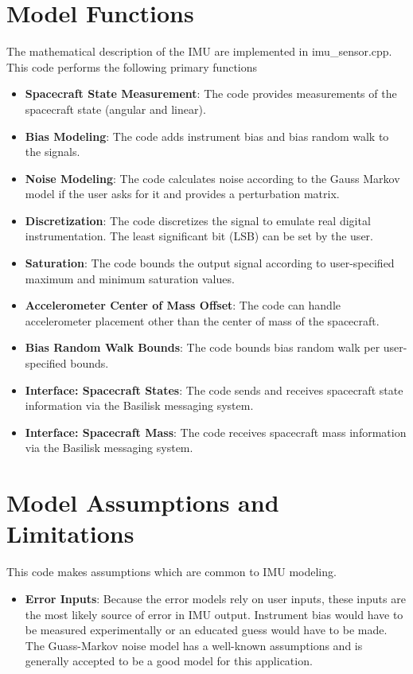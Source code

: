 \section{Model Functions}
The mathematical description of the IMU are implemented in imu\_sensor.cpp. This code performs the following primary functions
\begin{itemize}
	\item \textbf{Spacecraft State Measurement}: The code provides measurements of the spacecraft state (angular and linear).
	\item \textbf{Bias Modeling}: The code adds instrument bias and bias random walk to the signals.
	\item \textbf{Noise Modeling}: The code calculates noise according to the Gauss Markov model if the user asks for it and provides a perturbation matrix.
	\item \textbf{Discretization}: The code discretizes the signal to emulate real digital instrumentation. The least significant bit (LSB) can be set by the user.
	\item \textbf{Saturation}: The code bounds the output signal according to user-specified maximum and minimum saturation values.
	\item \textbf{Accelerometer Center of Mass Offset}: The code can handle accelerometer placement other than the center of mass of the spacecraft.
	\item \textbf{Bias Random Walk Bounds}: The code bounds bias random walk per user-specified bounds.
	\item \textbf{Interface: Spacecraft States}: The code sends and receives spacecraft state information via the Basilisk messaging system.
	\item \textbf{Interface: Spacecraft Mass}: The code receives spacecraft mass information via the Basilisk messaging system.
\end{itemize}


\section{Model Assumptions and Limitations}
This code makes assumptions which are common to IMU modeling.
\begin{itemize}
	\item \textbf{Error Inputs}: Because the error models rely on user inputs, these inputs are the most likely source of error in IMU output. Instrument bias would have to be measured experimentally or an educated guess would have to be made. The Guass-Markov noise model has a well-known assumptions and is generally accepted to be a good model for this application.
\end{itemize}